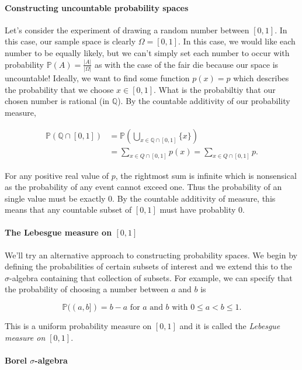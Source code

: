 \documentclass[12pt]{article}
\newcommand{\bbQ}{\mathbb{Q}}
\newcommand{\Prob}{\mathbb{P}}
\newcommand{\abs}[1]{ \left| #1 \right| }
\theoremstyle{definition}
\theoremstyle{remark}
\numberwithin{equation}{section}
\begin{document}
\paragraph{Constructing uncountable probability spaces}%
\label{par:constructing_uncountable_probability_spaces}

Let's consider the experiment of drawing a random number between $[0,1]$. In this case, our sample space is clearly $\Omega = [0,1]$. In this case, we would like each number to be equally likely, but we can't simply set each number to occur with probability $\Prob(A) = \frac{\abs{A}}{\abs{\Omega}}$ as with the case of the fair die because our space is uncountable! Ideally, we want to find some function $p(x)=p$ which describes the probability that we choose $x\in[0,1]$. What is the probabiltiy that our chosen number is rational (in $\bbQ$). By the countable additivity of our probability measure, 

\begin{align}
  \Prob(\bbQ \cap [0,1]) &= \Prob( \bigcup_{ x\in \bbQ\cap[0,1]} \{x\}) \\ 
                         &= \sum_{x\in Q\cap[0,1]} p(x) = \sum_{x\in Q\cap[0,1]} p. 
\end{align}

For any positive real value of $p$, the rightmost sum is infinite which is nonsensical as the probability of any event cannot exceed one. Thus the probability of an single value must be exactly 0. By the countable additivity of measure, this means that any countable subset of $[0,1]$ must have probablity 0.

\paragraph{The Lebesgue measure on $[0,1]$} We'll try an alternative approach to constructing probability spaces. We begin by defining the probabilities of certain subsets of interest and we extend this to the $\sigma$-algebra containing that collection of subsets. For example, we can specify that the probability of choosing a number between $a$ and $b$ is 

\begin{equation}
  \Prob((a,b]) = b - a \text{ for $a$ and $b$ with } 0\leq a < b \leq 1.
\end{equation}

This is a uniform probability measure on $[0,1]$ and it is called the \emph{Lebesgue measure on $[0,1]$}.

\paragraph{Borel $\sigma$-algebra}%
\label{par:borel_sigma_algebra}
\end{document}
